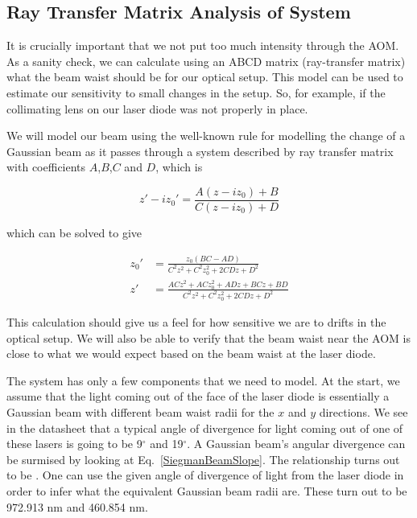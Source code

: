 \subsection{Ray Transfer Matrix Analysis of System}
It is crucially important that we not put too much intensity through the AOM. As a sanity check, we can calculate using an ABCD matrix (ray-transfer matrix) what the beam waist should be for our optical setup. This model can be used to estimate our sensitivity to small changes in the setup. So, for example, if the collimating lens on our laser diode was not properly in place.


We will model our beam using the well-known rule for modelling the change of a Gaussian beam as it passes through a system described by ray transfer matrix with coefficients $A$,$B$,$C$ and $D$, which is 

\begin{equation} \label{ABCDlawforGaussianBeams}
z'-iz_0'=\frac{A(z-iz_0)+B}{C(z-iz_0)+D}
\end{equation}
\cite{BYUOpticsBook}

which can be solved to give 

\begin{align}
z_0' &= \frac{ z_0 (BC-AD)}{C^2z^2+C^2z_0^2+2 C D z + D^2} \\
z' &=\frac{AC z^2+ACz_0^2+ADz+BCz+BD}{C^2z^2+C^2z_0^2+2 C D z + D^2}
\end{align}

This calculation should give us a feel for how sensitive we are to drifts in the optical setup. We will also be able to verify that the beam waist near the AOM is close to what we would expect based on the beam waist at the laser diode.

The system has only a few components that we need to model. At the start, we assume that the light coming out of the face of the laser diode is essentially a Gaussian beam with different beam waist radii for the $x$ and $y$ directions. We see in the datasheet that a typical angle of divergence for light coming out of one of these lasers is going to be 9$^\circ$ and 19$^\circ$. A Gaussian beam's angular divergence can be surmised by looking at Eq.\ \ref{SiegmanBeamSlope}. The relationship turns out to be \cite{MellesGriotGaussian}. One can use the given angle of divergence of light from the laser diode in order to infer what the equivalent Gaussian beam radii are. These turn out to be 972.913 nm and 460.854 nm. 

